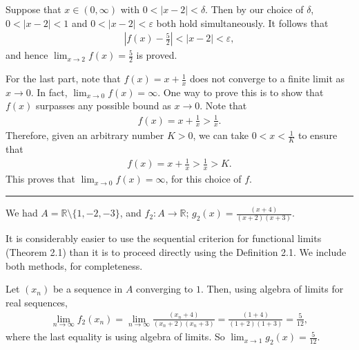 \documentclass[letterpaper,10pt,english]{jupyterBook}
\begin{document}
\sphinxAtStartPar
Suppose that \(x\in(0,\infty)\) with \(0<|x-2|<\delta\). Then by our choice of \(\delta\), \(0<|x-2|<1\) and \(0<|x-2|<\varepsilon\) both hold simultaneously. It follows that
\begin{equation*}
\begin{split}
\left|f(x)-\frac{5}{2}\right|<|x-2|<\varepsilon,
\end{split}
\end{equation*}
\sphinxAtStartPar
and hence \(\lim_{x\rightarrow 2}f(x)=\frac{5}{2}\) is proved.

\sphinxAtStartPar
For the last part, note that \(f(x)=x+\frac{1}{x}\) does not converge to a finite limit as \(x\rightarrow 0\). In fact, \(\lim_{x\rightarrow 0}f(x)=\infty\). One way to prove this is to show that \(f(x)\) surpasses any possible bound as \(x\rightarrow 0\). Note that
\begin{equation*}
\begin{split}
f(x) = x+\frac{1}{x} > \frac{1}{x}.
\end{split}
\end{equation*}
\sphinxAtStartPar
Therefore, given an arbitrary number \(K>0\), we can take \(0<x<\frac{1}{K}\) to ensure that
\begin{equation*}
\begin{split}
f(x) = x+\frac{1}{x} > \frac{1}{x} > K.
\end{split}
\end{equation*}
\sphinxAtStartPar
This proves that \(\lim_{x\rightarrow 0} f(x) = \infty\), for this choice of \(f\).


\bigskip\hrule\bigskip


\sphinxAtStartPar
{\hyperref[\detokenize{Problems:id4}]{}} We had \(A= \mathbb{R} \setminus \{1, -2, -3\}\), and \(f_2:A\to\mathbb{R}\); \(\displaystyle g_{2}(x)= \frac{(x + 4)}{(x + 2)(x + 3)}\).

\sphinxAtStartPar
It is considerably easier to use the sequential criterion for functional limits (Theorem 2.1) than it is to proceed directly using the Definition 2.1. We include both methods, for completeness.

\sphinxAtStartPar
{} 
Let \((x_n)\) be a sequence in \(A\) converging to \(1\). Then, using algebra of limits for real sequences,
\begin{equation*}
\begin{split}
\lim_{n\to\infty}f_2(x_n)= \lim_{n\to\infty} \frac{(x_n + 4)}{(x_n + 2)(x_n + 3)} =  \frac{(1 + 4)}{(1 + 2)(1 + 3)} = \frac{5}{12},
\end{split}
\end{equation*}
\sphinxAtStartPar
where the last equality is using algebra of limits. So \(\displaystyle\lim_{x \rightarrow 1}g_{2}(x) = \frac{5}{12}\).
\end{document}

